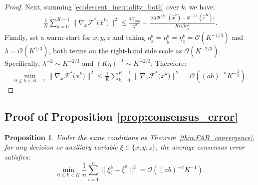 \documentclass{article}
\theoremstyle{plain}
\newtheorem{proposition}[theorem]{Proposition}
\theoremstyle{definition}
\theoremstyle{remark}
\begin{document}
\begin{proof}
Next, summing \eqref{eq:descent_inequality_both} over $k$, we have:
    \begin{align}\label{upper_gardhyper}
        \frac{1}{K} \sum_{k=0}^{K-1}\big\|\nabla_{x} \mathcal{F}^{*}\big({\bar{x}}^k\big) \big\|^{2} 
        \leq \frac{4\mathcal{C}_{gap}}{\lambda^{2}} + \frac{16\big(\Phi^{(b)}({\hat{x}}^{0}) - \Phi^{(b)}({\hat{x}}^{K}) \big)}{K \underline{\alpha}\underline{\beta}\eta_{x}^{k}}.
    \end{align}
    Finally,  set a warm-start for $x,y,z$  and  taking $\eta_{x}^{k}=\eta_{y}^{k}=\eta_{z}^{k}=\mathcal{O}\left(K^{-1/3}\right)$ and $\lambda=\mathcal{O}\left(K^{1/3}\right)$, both terms on the right-hand side scale as $\mathcal{O}(K^{-2/3})$. Specifically, $\lambda^{-2} \sim K^{-2/3}$ and $(K\eta)^{-1} \sim K^{-2/3}$. Therefore:
    \begin{align*}
        \min_{0 \le k < K-1} \big\|\nabla_{x} \mathcal{F}^{*}\big({\bar{x}}^k\big) \big\|^{2} \leq \frac{1}{K}\sum_{k=0}^{K-1} \big\|\nabla_{x} \mathcal{F}^{*}\big({\bar{x}}^k\big) \big\|^{2} = \mathcal{O}\left((ab)^{-n}K^{-\frac{2}{3}}\right).
    \end{align*}
\end{proof}
\subsection{Proof of Proposition \ref{prop:consensus_error}} 
\label{app:fab_prop}
\begin{proposition}
\label{prop:consensus_error_app}
    Under the same conditions as Theorem~\ref{thm:FAB_convergence}, for any decision or auxiliary variable $\xi \in \{x, y, z\}$, the average consensus error satisfies:
    \begin{equation}
        \min_{0 \le k < K} \frac{1}{n}\sum_{i=1}^{n} \|\xi_{i}^{k} - \bar{\xi}^k\|^2 = \mathcal{O}\left( (ab)^{-n} K^{-1} \right).
    \end{equation}
\end{proposition}
\end{document}
